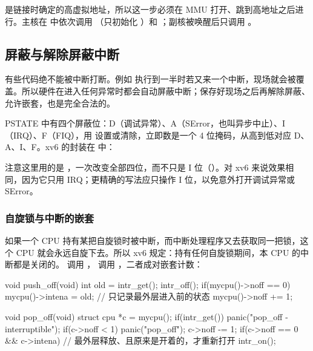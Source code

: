  是链接时确定的高虚拟地址，所以这一步必须在 MMU 打开、跳到高地址之后进行。主核在  中依次调用 （只初始化 ）和 ；副核被唤醒后只调用 。

\subsection{屏蔽与解除屏蔽中断}

有些代码绝不能被中断打断。例如  执行到一半时若又来一个中断，现场就会被覆盖。所以硬件在进入任何异常时都会自动屏蔽中断；保存好现场之后再解除屏蔽、允许嵌套，也是完全合法的。

PSTATE 中有四个屏蔽位：D（调试异常）、A（SError，也叫异步中止）、I（IRQ）、F（FIQ），用  设置或清除，立即数是一个 4 位掩码，从高到低对应 D、A、I、F。xv6 的封装在  中：


注意这里用的是 ，一次改变全部四位，而不只是 I 位（）。对 xv6 来说效果相同，因为它只用 IRQ；更精确的写法应只操作 I 位，以免意外打开调试异常或 SError。

\subsubsection{自旋锁与中断的嵌套}


如果一个 CPU 持有某把自旋锁时被中断，而中断处理程序又去获取同一把锁，这个 CPU 就会永远自旋下去。所以 xv6 规定：持有任何自旋锁期间，本 CPU 的中断都是关闭的。 调用 ， 调用 ，二者成对嵌套计数：

\begin{ccode}
void push_off(void)
{
  int old = intr_get();
  intr_off();
  if(mycpu()->noff == 0)
    mycpu()->intena = old;          // 只记录最外层进入前的状态
  mycpu()->noff += 1;
}

void pop_off(void)
{
  struct cpu *c = mycpu();
  if(intr_get())
    panic("pop_off - interruptible");
  if(c->noff < 1)
    panic("pop_off");
  c->noff -= 1;
  if(c->noff == 0 && c->intena)     // 最外层释放、且原来是开着的，才重新打开
    intr_on();
}
\end{ccode}

